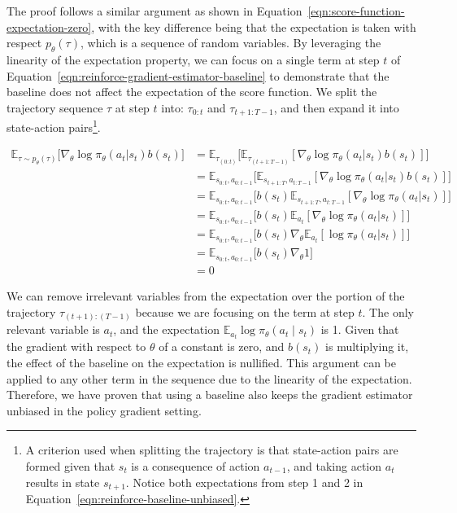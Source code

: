 \noindent The proof follows a similar argument as shown in Equation~\ref{eqn:score-function-expectation-zero}, with the key difference being that the expectation is taken with respect $p_{\theta}(\tau)$, which is a sequence of random variables. By leveraging the linearity of the expectation property, we can focus on a single term at step $t$ of Equation~\ref{eqn:reinforce-gradient-estimator-baseline} to demonstrate that the baseline does not affect the expectation of the score function. We split the trajectory sequence $\tau$ at step $t$ into: $\tau_{0:t}$ and $\tau_{t+1:T-1}$, and then expand it into state-action pairs\footnote{A criterion used when splitting the trajectory is that state-action pairs are formed given that $s_{t}$ is a consequence of action $a_{t-1}$, and taking action $a_{t}$ results in state $s_{t+1}$. Notice both expectations from step 1 and 2 in Equation~\ref{eqn:reinforce-baseline-unbiased}.}.

\begin{equation}\label{eqn:reinforce-baseline-unbiased}
   \begin{split}
        \mathbb{E}_{\tau\sim p_{\theta}(\tau)}\big[\nabla_{\theta}\log\pi_{\theta}(a_t|s_t) b(s_t) \big] &=  \mathbb{E}_{\tau_{(0:t)}}\big[\mathbb{E}_{\tau_{(t+1:T-1)}}[ \nabla_{\theta}\log \pi_{\theta}(a_{t}|s_{t})b(s_{t})]\big]  \\
        &= \mathbb{E}_{s_{0:t}, a_{0:t-1}}\big[\mathbb{E}_{s_{t+1:T}, a_{t:T-1}}[ \nabla_{\theta}\log \pi_{\theta}(a_{t}|s_{t})b(s_{t})]\big] \\
        &= \mathbb{E}_{s_{0:t}, a_{0:t-1}}\big[b(s_{t})\mathbb{E}_{s_{t+1:T}, a_{t:T-1}}[ \nabla_{\theta}\log \pi_{\theta}(a_{t}|s_{t})]\big] \\
        &= \mathbb{E}_{s_{0:t}, a_{0:t-1}}\big[b(s_{t})\mathbb{E}_{a_{t}}[ \nabla_{\theta}\log \pi_{\theta}(a_{t}|s_{t})]\big] \\
        &= \mathbb{E}_{s_{0:t}, a_{0:t-1}}\big[b(s_{t})\nabla_{\theta}\mathbb{E}_{a_{t}}[\log \pi_{\theta}(a_{t}|s_{t})]\big] \\
        &= \mathbb{E}_{s_{0:t}, a_{0:t-1}}\big[b(s_{t})\nabla_{\theta}1\big] \\
        &= 0
   \end{split}
\end{equation}

\noindent We can remove irrelevant variables from the expectation over the portion of the trajectory $\tau_{(t+1):(T-1)}$ because we are focusing on the term at step $t$. The only relevant variable is $a_{t}$, and the expectation $\mathbb{E}_{a_{t}}\log\pi_{\theta}(a_{t}\mid s_{t})$ is 1. Given that the
gradient with respect to $\theta$ of a constant is zero, and $b(s_{t})$ is multiplying it, the effect of the baseline on the expectation is nullified. This argument can be applied to any other term in the sequence due to the linearity of the expectation. Therefore, we have proven that using a baseline also keeps the gradient estimator unbiased in the policy gradient setting. \\


